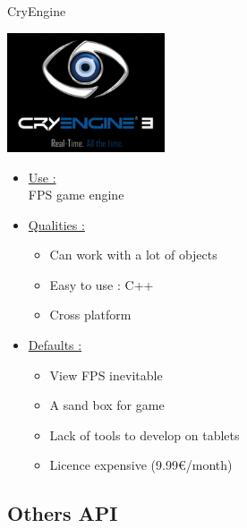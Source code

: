 \documentclass[a4paper,10pt]{beamer}
\begin{document}
			\begin{frame}{CryEngine}
				\begin{multicols}{2}
					\includegraphics[height=100pt]{images/logos/Cry_Engine.png}\\
					
					\columnbreak 
					
					\begin{itemize}
						\item \underline{Use :}\\		
						FPS game engine				
						\item \underline{Qualities :}\\
						\begin{itemize}
							\item Can work with a lot of objects
							\item Easy to use : C++
							\item Cross platform
						\end{itemize}
					\end{itemize}		 
				\end{multicols}
				\begin{itemize}
					\item \underline{Defaults :}\\
					\begin{itemize}
						\item View FPS inevitable
						\item A sand box for game
						\item Lack of tools to develop on tablets
						\item Licence expensive (9.99\euro/month)
					\end{itemize}
				\end{itemize}
			\end{frame}
			
			
		\subsection{Others API}
		
\end{document}
